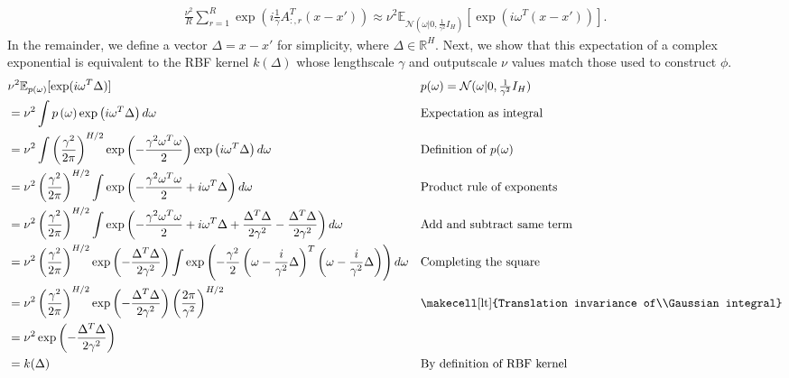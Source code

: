 \begin{align}
    \frac{\nu^2}{R} \sum_{r=1}^R \exp \left( i \frac{1}{\gamma} A_{:,r}^T (x-x') \right) \approx \nu^2\mathbb{E}_{\mathcal{N}(\omega | 0, \frac{1}{\gamma^2} I_H)}[\exp(i\omega^T (x-x'))].
\end{align}
In the remainder, we define a vector $\Delta = x - x'$ for simplicity, where $\Delta \in \mathbb{R}^H$.
Next, we show that this expectation of a complex exponential is equivalent to the RBF kernel $k(\Delta)$ whose lengthscale $\gamma$ and outputscale $\nu$ values match those used to construct $\phi$.
\begin{align}
    & \nu^2\mathbb{E}_{p(\omega)}[\exp(i\omega^T\Delta)] && p(\omega) = \textstyle \mathcal{N}(\omega | 0, \frac{1}{\gamma^2} I_H)
    \\
    & = \nu^2 \int p\left(\omega\right) \exp\left(i\omega^T\Delta\right) d\omega && \text{Expectation as integral}
    \\
    &= \nu^2 \int \left(\frac{\gamma^2}{2\pi}\right)^{H/2} \exp\left(- \frac{\gamma^2\omega^T\omega}{2} \right) \exp\left(i\omega^T\Delta\right) d\omega && \text{Definition of $p(\omega)$} \\
    &= \nu^2 \left(\frac{\gamma^2}{2\pi}\right)^{H/2} \int \exp\left(- \frac{\gamma^2\omega^T\omega}{2} + i\omega^T\Delta\right) d\omega && \text{Product rule of exponents} \\
    &= \nu^2 \left(\frac{\gamma^2}{2\pi}\right)^{H/2} \int \exp\left(- \frac{\gamma^2\omega^T\omega}{2} + i\omega^T\Delta + \frac{\Delta^T\Delta}{2\gamma^2} - \frac{\Delta^T\Delta}{2\gamma^2}\right) d\omega && \text{Add and subtract same term} \\
    &= \nu^2 \left(\frac{\gamma^2}{2\pi}\right)^{H/2} \exp\left( - \frac{\Delta^T\Delta}{2\gamma^2} \right) \int \exp\left(- \frac{\gamma^2}{2} \left(\omega - \frac{i}{\gamma^2}\Delta\right)^T \left(\omega - \frac{i}{\gamma^2}\Delta\right) \right) d\omega && \text{Completing the square} \\
    &= \nu^2 \left(\frac{\gamma^2}{2\pi}\right)^{H/2} \exp\left( - \frac{\Delta^T\Delta}{2\gamma^2} \right) \left(\frac{2\pi}{\gamma^2}\right)^{H/2} && \text{\makecell[lt]{Translation invariance of\\Gaussian integral}} \\
    &= \nu^2 \exp\left( - \frac{\Delta^T\Delta}{2\gamma^2} \right) \\
    &= k(\Delta) && \text{By definition of RBF kernel}
\end{align}
